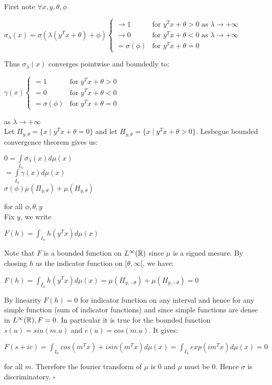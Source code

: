 \documentclass[12pt]{article}
\newenvironment{proof}{{\sc Proof:}}{\hfill $\square$}
\begin{document}
  \begin{proof}
    First note $\forall x,y,\theta, \phi$ 
\begin{center}
  $\sigma_\lambda(x) = \sigma(\lambda (y^Tx + \theta) + \phi)
  \begin{cases}
    \to 1 &\text{for $y^Tx+\theta > 0$ as $\lambda \to +\infty$}\\
    \to 0 &\text{for $y^Tx+\theta < 0$ as $\lambda \to +\infty$}\\
    =\sigma(\phi) & \text{for $y^Tx+\theta = 0$}
  \end{cases}$
\end{center}
Thus $\sigma_\lambda(x)$ converges pointwise and boundedly to:

\begin{center}
  $\gamma(x)
  \begin{cases}
    =1 &\text{for $y^Tx+\theta > 0$}\\
    =0 &\text{for $y^Tx+\theta < 0$}\\
    =\sigma(\phi) & \text{for $y^Tx+\theta = 0$}
  \end{cases}$
\end{center}
as $\lambda \to +\infty$\\
\sv
Let $\Pi_{y,\theta} = \{x \mid y^Tx+\theta = 0\}$ and let $H_{y,\theta} = \{x \mid y^Tx + \theta > 0\}$. Lesbegue bounded convergence theorem gives us:\\
\begin{center}
  $0 = \int\limits_{I_n}\sigma_\lambda(x)d\mu(x)$\\
  $ = \int\limits_{I_n} \gamma(x)d\mu(x)$\\
  $\sigma(\phi)\mu(\Pi_{y,\theta}) + \mu(H_{y,\theta})$
\end{center}
for all $\phi, \theta, y$\\
\sv
Fix $y$, we write \\
\begin{center}
  $F(h) = \int_{I_n}h(y^Tx)d\mu(x)$
\end{center}
Note that $F$ is a bounded function on $L^\infty(\mathbb{R})$ since $\mu$ is a signed mesure. By chosing  $h$ as the indicator function on $[\theta, \infty[$, we have:
\begin{center}
  $F(h) = \int_{I_n} h(y^Tx) d\mu(x) = \mu(\Pi_{y,-\theta}) + \mu(H_{y,-\theta}) = 0$
\end{center}
By linearity $F(h) = 0$ for indicator function on any interval and hence for any simple function (sum of indicator functions) and since simple functions are dense in $L^{\infty}(\mathbb{R}), F = 0$.
In particular it is true for the bounded function $s(u) = sin(m.u)$ and $c(u) = cos(m.u)$. It gives:
\begin{center}
  $F(s+ic) = \int_{I_n} cos(m^Tx) + i sin(m^Tx) d\mu(x) = \int_{I_n} exp(im^Tx)d\mu(x) = 0$
\end{center}
for all $m$. Therefore the fourier transform of $\mu$ is 0 and $\mu$ must be 0. Hence $\sigma$ is discriminatory.
  \end{proof}\\
\end{document}
